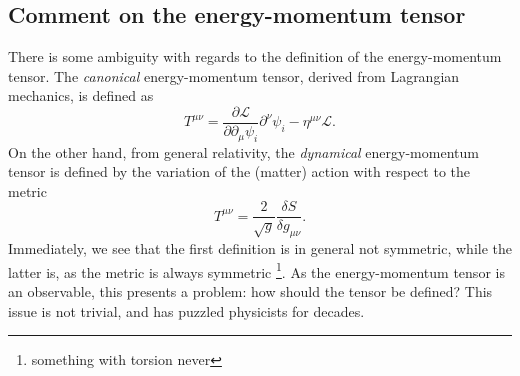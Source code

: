 \subsection{Comment on the energy-momentum tensor}\label{sec:commen-T}
There is some ambiguity with regards to the definition of the energy-momentum tensor\cites{kachelriessQuantumFieldsHubble2018}{chernodubThermalTransportGeometry2021}{vanderwurffMagnetovorticalThermoelectricTransport2019}{forgerCurrentsEnergyMomentumTensor2004}.
The \emph{canonical} energy-momentum tensor, derived from Lagrangian mechanics, is defined as
\begin{equation}
	T^{\mu \nu } = \frac{\partial \mathcal{L}}{\partial \partial _{\mu } \psi_i } \partial ^{\nu } \psi_i - \eta^{\mu \nu } \mathcal{L}.
\end{equation}
On the other hand, from general relativity, the \emph{dynamical} energy-momentum tensor is defined by the variation of the (matter) action with respect to the metric\cite{kachelriessQuantumFieldsHubble2018}
\begin{equation}
	T^{\mu \nu} = \frac{2}{\sqrt{g} } \frac{\delta S}{\delta g_{\mu \nu}}.
\end{equation}
Immediately, we see that the first definition is in general not symmetric, while the latter is, as the metric is always symmetric \footnote{something with torsion never}.
As the energy-momentum tensor is an observable, this presents a problem:
how should the tensor be defined?
This issue is not trivial, and has puzzled physicists for decades\cite{forgerCurrentsEnergyMomentumTensor2004}.


